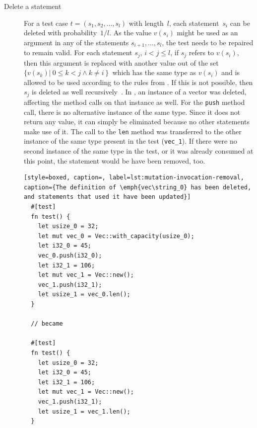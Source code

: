 \documentclass[paper=a4,%
  twoside,%
  BCOR4mm,%
  abstract=true,%
  toc=bibliography,%
  chapterprefix=true,%
  toc=bibliographynumbered,%
  open=right,%
  english,%
  pagesize=pdftex]{scrreprt}
\begin{document}
\begin{description}
  \item[Delete a statement] For a test case $t = (s_1, s_2, \dots, s_l)$ with length~$l$, each statement~$s_i$ can be deleted with probability~$1/l$. As the value $v(s_i)$ might be used as an argument in any of the statements $s_{i+1}, \dots, s_l$, the test needs to be repaired to remain valid. For each statement $s_j$, $i < j \leq l$, if $s_j$ refers to $v(s_i)$, then this argument is replaced with another value out of the set $\{v(s_k) \left|~0 \leq k < j \wedge k \neq i \right\}$ which has the same type as $v(s_i)$ and is allowed to be used according to the rules from . If this is not possible, then $s_j$ is deleted as well recursively~\cite{Fraser2012}. In , an instance of a vector was deleted, affecting the method calls on that instance as well. For the \texttt{push} method call, there is no alternative instance of the same type. Since it does not return any value, it can simply be eliminated because no other statements make use of it. The call to the \texttt{len} method was transferred to the other instance of the same type present in the test (\texttt{vec\string_1}). If there were no second instance of the same type in the test, or it was already consumed at this point, the statement would be have been removed, too.

  \begin{lstlisting}[style=boxed, caption=, label=lst:mutation-invocation-removal, caption={The definition of \emph{vec\string_0} has been deleted, and statements that used it have been updated}]
  #[test]
  fn test() {
    let usize_0 = 32;
    let mut vec_0 = Vec::with_capacity(usize_0);
    let i32_0 = 45;
    vec_0.push(i32_0);
    let i32_1 = 106;
    let mut vec_1 = Vec::new();
    vec_1.push(i32_1);
    let usize_1 = vec_0.len();
  }

  // became

  #[test]
  fn test() {
    let usize_0 = 32;
    let i32_0 = 45;
    let i32_1 = 106;
    let mut vec_1 = Vec::new();
    vec_1.push(i32_1);
    let usize_1 = vec_1.len();
  }
  \end{lstlisting}

\end{description}
\end{document}
